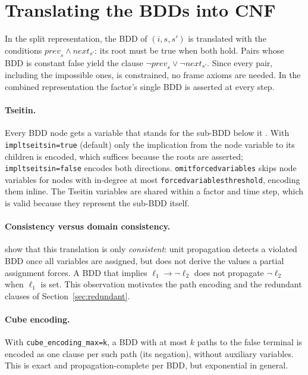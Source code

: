 \documentclass[manuscript, screen]{jair}
\newcommand{\opt}[1]{\texttt{#1}}
\newcommand{\prev}[1]{\mathit{prev}_{#1}}
\newcommand{\nxt}[1]{\mathit{next}_{#1}}
\begin{document}
\section{Translating the BDDs into CNF}\label{sec:cnf}

In the split representation, the BDD of $(i,s,s')$ is translated with the conditions
$\prev{s} \wedge \nxt{s'}$: its root must be true when both hold. Pairs whose BDD is constant false
yield the clause $\neg\prev{s} \vee \neg\nxt{s'}$. Since every pair, including the impossible ones,
is constrained, no frame axioms are needed. In the combined representation the factor's single BDD is
asserted at every step.

\paragraph{Tseitin.} Every BDD node gets a variable that stands for the sub-BDD below it
\parencite{tseitin1968,een-sorensson-jsat2006}. With \opt{impltseitsin=true} (default) only the
implication from the node variable to its children is encoded, which suffices because the roots are
asserted; \opt{impltseitsin=false} encodes both directions. \opt{omitforcedvariables} skips node
variables for nodes with in-degree at most \opt{forcedvariablesthreshold}, encoding them inline. The
Tseitin variables are shared within a factor and time step, which is valid because they represent the
sub-BDD itself.

\paragraph{Consistency versus domain consistency.} \textcite{abio-et-al-cpaior2016} show that this
translation is only \emph{consistent}: unit propagation detects a violated BDD once all variables are
assigned, but does not derive the values a partial assignment forces. A BDD that implies
$\ell_1 \rightarrow \neg\ell_2$ does not propagate $\neg\ell_2$ when $\ell_1$ is set. This observation
motivates the path encoding and the redundant clauses of Section~\ref{sec:redundant}.

\paragraph{Cube encoding.} With \opt{cube\_encoding\_max=k}, a BDD with at most $k$ paths to the
false terminal is encoded as one clause per such path (its negation), without auxiliary variables.
This is exact and propagation-complete per BDD, but exponential in general.
\end{document}
